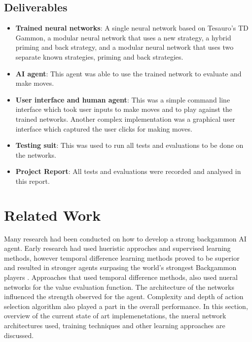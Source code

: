 \documentclass[12pt,a4paper]{article}
\begin{document}
\subsection{Deliverables}
\begin{itemize}
    \item \textbf{Trained neural networks}: A single neural network based on Tesauro's TD Gammon, a modular neural network that uses a new strategy, a hybrid priming and back strategy, and a modular neural network that uses two separate known strategies, priming and back strategies.
    \item \textbf{AI agent}: This agent was able to use the trained network to evaluate and make moves.
    \item \textbf{User interface and human agent}: This was a simple command line interface which took user inputs to make moves and to play against the trained networks. Another complex implementation was a graphical user interface which captured the user clicks for making moves.
    \item \textbf{Testing suit}: This was used to run all tests and evaluations to be done on the networks.
    \item \textbf{Project Report}: All tests and evaluations were recorded and analysed in this report.
\end{itemize}

\section{Related Work}
Many research had been conducted on how to develop a strong backgammon AI agent. Early research had used hueristic approches and supervised learning methods, however temporal difference learning methods proved to be superior and resulted in stronger agents surpasing the world's strongest Backgammon players \cite{DBLP:journals/ai/Tesauro02}. Approaches that used temporal difference methods, also used nueral networks for the  value evaluation function. The architecture of the networks influenced the strength observed for the agent. Complexity and depth of action selection algorithm also played a part in the overall performance. In this section, overview of the current state of art implemenetations, the nueral network architectures used, training techniques and other learning approaches are discussed. 
\end{document}
